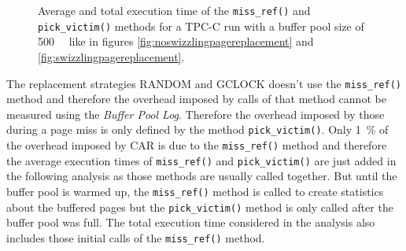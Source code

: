 \begin{@empty}
	\begin{figure}[ht!]
		\centering
		\caption{Average and total execution time of the \lstinline{miss_ref()} and \lstinline{pick_victim()} methods for a TPC-C run with a buffer pool size of \SI{500}{\mebi\byte} like in figures \ref{fig:noswizzlingpagereplacement} and \ref{fig:swizzlingpagereplacement}.}
		\label{fig:evictionperformance500M}
	\end{figure}
\end{@empty}

	The replacement strategies RANDOM and GCLOCK doesn't use the \lstinline{miss_ref()} method and therefore the overhead imposed by calls of that method cannot be measured using the \textit{Buffer Pool Log}. Therefore the overhead imposed by those during a page miss is only defined by the method \lstinline{pick_victim()}. Only \SI{1}{\percent} of the overhead imposed by CAR is due to the \lstinline{miss_ref()} method and therefore the average execution times of \lstinline{miss_ref()} and \lstinline{pick_victim()} are just added in the following analysis as those methods are usually called together. But until the buffer pool is warmed up, the \lstinline{miss_ref()} method is called to create statistics about the buffered pages but the \lstinline{pick_victim()} method is only called after the buffer pool was full. The total execution time considered in the analysis also includes those initial calls of the \lstinline{miss_ref()} method.
	
